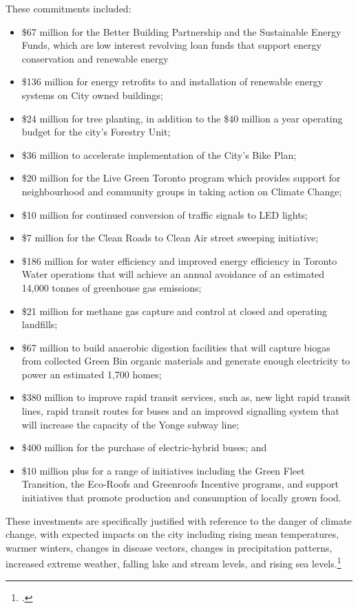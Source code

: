 These commitments included:
\begin{itemize}
	\item \$67 million for the Better Building Partnership and the Sustainable Energy Funds, which are low interest revolving loan funds that support energy conservation and renewable energy
	\item \$136 million for energy retrofits to and installation of renewable energy systems on City owned buildings; 
	\item \$24 million for tree planting, in addition to the \$40 million a year operating budget for the city's Forestry Unit; 
	\item \$36 million to accelerate implementation of the City's Bike Plan; 
	\item \$20 million for the Live Green Toronto program which provides support for neighbourhood and community groups in taking action on Climate Change; 
	\item \$10 million for continued conversion of traffic signals to LED lights; 
	\item \$7 million for the Clean Roads to Clean Air street sweeping initiative; 
	\item \$186 million for water efficiency and improved energy efficiency in Toronto Water operations that will achieve an annual avoidance of an estimated 14,000 tonnes of greenhouse gas emissions; 
	\item \$21 million for methane gas capture and control at closed and operating landfills; 
	\item \$67 million to build anaerobic digestion facilities that will capture biogas from collected Green Bin organic materials and generate enough electricity to power an estimated 1,700 homes; 
	\item \$380 million to improve rapid transit services, such as, new light rapid transit lines, rapid transit routes for buses and an improved signalling system that will increase the capacity of the Yonge subway line; 
	\item \$400 million for the purchase of electric-hybrid buses; and 
	\item \$10 million plus for a range of initiatives including the Green Fleet Transition, the Eco-Roofs and Greenroofs Incentive programs, and support initiatives that promote production and consumption of locally grown food.
\end{itemize}



These investments are specifically justified with reference to the danger of climate change, with expected impacts on the city including rising mean temperatures, warmer winters, changes in disease vectors, changes in precipitation patterns, increased extreme weather, falling lake and stream levels, and rising sea levels.\footcite{TorontoEnvOff2007}



